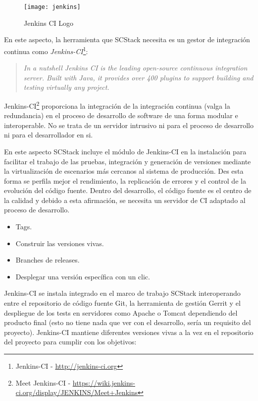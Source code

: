 \begin{figure}[H]
    \centering
    \texttt{[image: jenkins]}
    \caption{Jenkins CI Logo}
    \label{fig:jenkins-logo}
\end{figure}


\par En este aspecto, la herramienta que SCStack necesita es un gestor de integración continua como \emph{Jenkins-CI}\footnote{Jenkins-CI - \url{http://jenkins-ci.org}}:

\begin{quote}
    \emph{In a nutshell Jenkins CI is the leading open-source continuous integration server. Built with Java, it provides over 400 plugins to support building and testing virtually any project.}
\end{quote}

\par Jenkins-CI\footnote{Meet Jenkins-CI - \url{https://wiki.jenkins-ci.org/display/JENKINS/Meet+Jenkins}} proporciona la integración de la integración continua (valga la redundancia) en el proceso de desarrollo de software de una forma modular e interoperable. No se trata de un servidor intrusivo ni para el proceso de desarrollo ni para el desarrollador en si.

\par En este aspecto SCStack incluye el módulo de Jenkins-CI en la instalación para facilitar el trabajo de las pruebas, integración y generación de versiones mediante la virtualización de escenarios más cercanos al sistema de producción. Des esta forma se perfila mejor el rendimiento, la replicación de errores y el control de la evolución del código fuente. Dentro del desarrollo, el código fuente es el centro de la calidad y debido a esta afirmación, se necesita un servidor de CI adaptado al proceso de desarrollo.

\begin{itemize}
	\item Tags.
	\item Construir las versiones vivas.
	\item Branches de releases.
	\item Desplegar una versión específica con un clic.
\end{itemize}

\par Jenkins-CI se instala integrado en el marco de trabajo SCStack interoperando entre el repositorio de código fuente Git, la herramienta de gestión Gerrit y el despliegue de los tests en servidores como Apache o Tomcat dependiendo del producto final (esto no tiene nada que ver con el desarrollo, sería un requisito del proyecto). Jenkins-CI mantiene diferentes versiones vivas a la vez en el repositorio del proyecto para cumplir con los objetivos:

